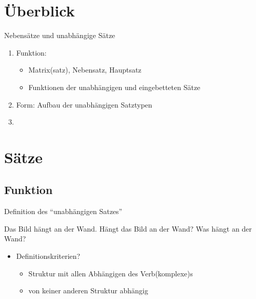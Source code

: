 

\section{Überblick}

\begin{frame}
  {Nebensätze und unabhängige Sätze}
  \pause
  \begin{enumerate}[<+->]
    \item \alert{Funktion}:
    \begin{itemize}[<+->]
      \item Matrix(satz), Nebensatz, Hauptsatz
      \item Funktionen der unabhängigen und eingebetteten Sätze 
    \end{itemize}
    \item \alert{Form}: Aufbau der unabhängigen Satztypen
    \item \citet{Schaefer2018b}
  \end{enumerate}
\end{frame}




\section{Sätze}

\subsection{Funktion}

\begin{frame}
  {Definition des "`unabhängigen Satzes"'}
  \pause
  \begin{exe}
    \ex Das Bild hängt an der Wand.
    \pause
    \ex Hängt das Bild an der Wand?
    \pause
    \ex Was hängt an der Wand?
  \end{exe}
  \pause
  \begin{itemize}[<+->]
    \item Definitionskriterien?
      \begin{itemize}[<+->]
        \item Struktur mit \alert{allen Abhängigen} des Verb(komplexe)s
        \item \alert{von keiner anderen Struktur abhängig}
      \end{itemize}
  \end{itemize}
\end{frame}

